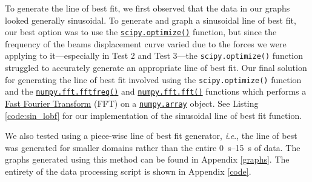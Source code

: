 \documentclass[12 pt]{report}
\newcommand{\ie}{\textit{i}.\textit{e}., }
\begin{document}


To generate the line of best fit, we first observed that the data in our graphs looked generally sinusoidal. To generate and graph a sinusoidal line of best fit, our best option was to use the \href{https://docs.scipy.org/doc/scipy/tutorial/optimize.html}{\texttt{scipy.optimize()}} function, but since the frequency of the beams displacement curve varied due to the forces we were applying to it---especially in Test 2 and Test 3---the \texttt{scipy.optimize()} function struggled to accurately generate an appropriate line of best fit. Our final solution for generating the line of best fit involved using the \texttt{scipy.optimize()} function and the \href{https://numpy.org/doc/stable/reference/generated/numpy.fft.fftfreq.html}{\texttt{numpy.fft.fftfreq()}} and \href{https://numpy.org/doc/stable/reference/generated/numpy.fft.fft.html}{\texttt{numpy.fft.fft()}} functions which performs a \href{https://en.wikipedia.org/wiki/Fast_Fourier_transform}{Fast Fourier Transform} (FFT) on a \href{https://numpy.org/doc/stable/reference/generated/numpy.array.html}{\texttt{numpy.array}} object. See Listing \ref{code:sin_lobf} for our implementation of the sinusoidal line of best fit function.



We also tested using a piece-wise line of best fit generator, \ie the line of best was generated for smaller domains rather than the entire \qtyrange{0}{15}{\s} of data. The graphs generated using this method can be found in Appendix \ref{graphs}. The entirety of the data processing script is shown in Appendix \ref{code}.
\end{document}
